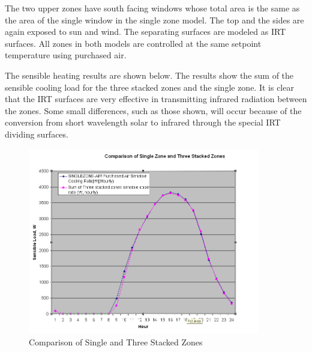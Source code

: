 The two upper zones have south facing windows whose total area is the same as the area of the single window in the single zone model. The top and the sides are again exposed to sun and wind. The separating surfaces are modeled as IRT surfaces. All zones in both models are controlled at the same setpoint temperature using purchased air.

The sensible heating results are shown below. The results show the sum of the sensible cooling load for the three stacked zones and the single zone. It is clear that the IRT surfaces are very effective in transmitting infrared radiation between the zones. Some small differences, such as those shown, will occur because of the conversion from short wavelength solar to infrared through the special IRT dividing surfaces.

\begin{figure}[hbtp] %
\centering
\includegraphics[width=0.9\textwidth, height=0.9\textheight, keepaspectratio=true]{media/image398.png}
\caption{Comparison of Single and Three Stacked Zones \protect \label{fig:comparison-of-single-and-three-stacked-zones}}
\end{figure}
